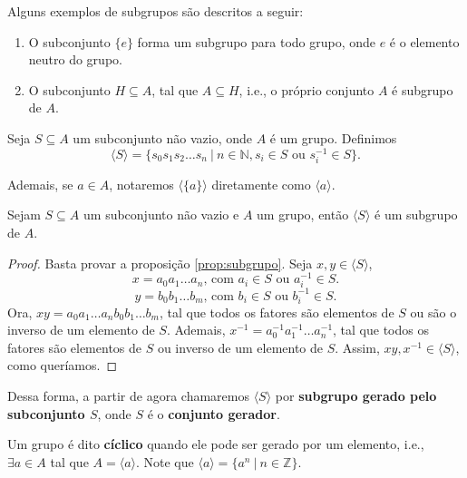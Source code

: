 \documentclass[11pt,openany]{book}
\newcommand{\separate}{\vspace{1.5em}}
\newcommand{\gen}[1]{\ensuremath{\langle #1\rangle}}
\begin{document}
    \separate

    Alguns exemplos de subgrupos são descritos a seguir:
    \begin{enumerate}[label=Exemplo \arabic*),align=left]
        \item O subconjunto $\{e\}$ forma um subgrupo para todo grupo, onde $e$ é o elemento neutro do grupo.

        \item O subconjunto $H \subseteq A$, tal que $A \subseteq H$, i.e., o próprio conjunto $A$ é subgrupo de $A$.
    \end{enumerate}


    \begin{definition}
    \label{def:subgrupo_gerado}
        Seja $S \subseteq A$ um subconjunto não vazio, onde $A$ é um grupo. Definimos
        \[\gen{S} = \{s_0s_1s_2 \dots s_n \ | \ n \in \mathbb{N}, s_i \in S \text{ ou } s_i^{-1} \in S\}.\]

        Ademais, se $a \in A$, notaremos $\gen{\{a\}}$ diretamente como $\gen{a}$.
    \end{definition}

    \begin{proposition}
    \label{prop:subgrupo_gerado}
        Sejam $S \subseteq A$ um subconjunto não vazio e $A$ um grupo, então $\gen{S}$ é um subgrupo de $A$.
    \end{proposition}
    
    \begin{proof}
        Basta provar a proposição \ref{prop:subgrupo}.
        Seja $x,y \in \gen{S}$,
        \[x = a_0a_1\dots a_n\text{, com $a_i \in S$ ou $a_i^{-1} \in S$.}\]
        \[y = b_0b_1\dots b_m\text{, com $b_i \in S$ ou $b_i^{-1} \in S$.}\]
        Ora, $xy = a_0a_1\dots a_nb_0b_1\dots b_m$, tal que todos os fatores são elementos de $S$ ou são o inverso de um elemento de $S$. Ademais, $x^{-1} = a_0^{-1}a_1^{-1}\dots a_n^{-1}$, tal que todos os fatores são elementos de $S$ ou inverso de um elemento de $S$. Assim, $xy, x^{-1} \in \gen{S}$, como queríamos.
    \end{proof}

    Dessa forma, a partir de agora chamaremos $\gen{S}$ por \textbf{subgrupo gerado pelo subconjunto $S$}, onde $S$ é o \textbf{conjunto gerador}.
    

    \begin{definition}
    \label{def:ciclico}
        Um grupo é dito \textbf{cíclico} quando ele pode ser gerado por um elemento, i.e., $\exists a \in A$ tal que $A = \gen{a}$. Note que $\gen{a} = \{a^n \ | \ n \in \mathbb{Z}\}$.
    \end{definition}
\end{document}
